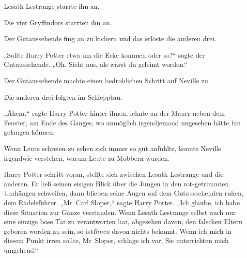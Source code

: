 Lesath Lestrange starrte ihn an.

Die vier Gryffindors starrten ihn an.

Der Gutaussehende fing an zu kichern und das erlöste die anderen drei.

„Sollte Harry Potter etwa um die Ecke kommen oder so?“ sagte der Gutaussehende. „Oh. Sieht aus, als wärst du geleimt worden.“

Der Gutaussehende machte einen bedrohlichen Schritt auf Neville zu.

Die anderen drei folgten im Schlepptau.

„Ähem,“ sagte Harry Potter hinter ihnen, lehnte an der Mauer neben dem Fenster, am Ende des Ganges, wo unmöglich irgendjemand ungesehen hätte hin gelangen können.

Wenn Leute schreien zu sehen sich immer so gut anfühlte, konnte Neville irgendwie verstehen, warum Leute zu Mobbern wurden.

Harry Potter schritt voran, stellte sich zwischen Lesath Lestrange und die anderen. Er ließ seinen eisigen Blick über die Jungen in den rot-getrimmten Umhängen schweifen, dann blieben seine Augen auf dem Gutaussehenden ruhen, dem Rädelsführer. „Mr~Carl Sloper,“ sagte Harry Potter. „Ich glaube, ich habe diese Situation zur Gänze verstanden. Wenn Lesath Lestrange selbst auch nur eine einzige böse Tat zu verantworten hat, abgesehen davon, den falschen Eltern geboren worden zu sein, so ist\emph{Ihnen} davon nichts bekannt. Wenn ich mich in diesem Punkt irren sollte, Mr~Sloper, schlage ich vor, Sie unterrichten mich umgehend.“

